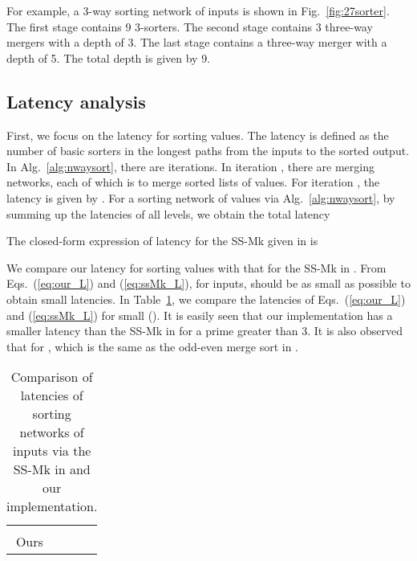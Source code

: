 \documentclass[10pt,journal,cspaper,compsoc]{IEEEtran}
\begin{document}
For example, a 3-way sorting network of  inputs is shown in Fig.~\ref{fig:27sorter}. The first stage contains 9 3-sorters. The second stage contains 3 three-way mergers with a depth of 3. The last stage contains a three-way merger with a depth of 5. The total depth is given by 9.


\subsection{Latency analysis}
First, we focus on the latency for sorting  values. The latency is defined as the number of basic sorters in the longest paths from the inputs to the sorted output. In Alg.~\ref{alg:nwaysort}, there are  iterations. In iteration , there are  merging networks, each of which is to merge  sorted lists of  values. For iteration , the latency is given by .
For a sorting network of  values via Alg.~\ref{alg:nwaysort}, by summing up the latencies of all levels, we obtain the total latency

The closed-form expression of latency for the SS-Mk given in \cite{gao1997sloping} is


We compare our latency for sorting  values with that for the SS-Mk in \cite{gao1997sloping}. From Eqs.~(\ref{eq:our_L}) and (\ref{eq:ssMk_L}), for  inputs,  should be as small as possible to obtain small latencies.
In Table~\ref{tab:latency}, we compare the latencies of Eqs.~(\ref{eq:our_L}) and (\ref{eq:ssMk_L}) for small  (). It is easily seen that our implementation has a smaller latency than the SS-Mk in \cite{gao1997sloping} for a prime greater than 3. It is also observed that  for , which is the same as the odd-even merge sort in \cite{Bat68sorting}.

\begin{table}[!th]
\caption{Comparison of latencies of sorting networks of  inputs via the SS-Mk in \cite{gao1997sloping} and our implementation.}\label{tab:latency}
\begin{center}
\begin{tabular}{|c|c|c|c|}
\hline
&  &  &  \\
\hline
\cite{gao1997sloping} &  &  &  \\
\hline
Ours &  &  & \\
\hline
\end{tabular}
\end{center}
\end{table}
\end{document}
